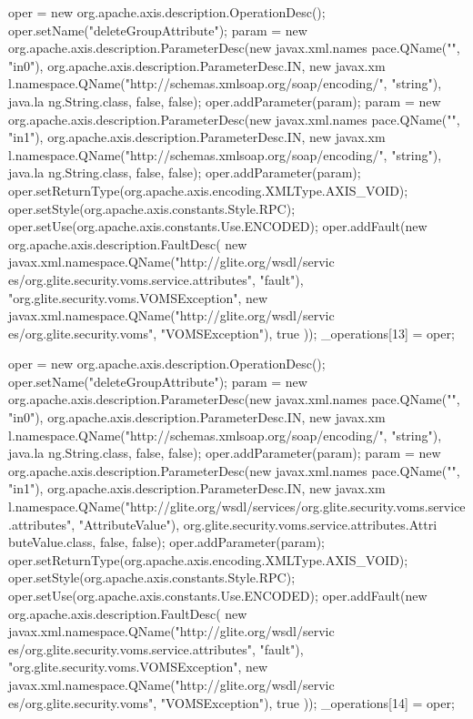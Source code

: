 \begin{DoxyCode}
{        oper = new org.apache.axis.description.OperationDesc();
        oper.setName("deleteGroupAttribute");
        param = new org.apache.axis.description.ParameterDesc(new javax.xml.names
      pace.QName("", "in0"), org.apache.axis.description.ParameterDesc.IN, new javax.xm
      l.namespace.QName("http://schemas.xmlsoap.org/soap/encoding/", "string"), java.la
      ng.String.class, false, false);
        oper.addParameter(param);
        param = new org.apache.axis.description.ParameterDesc(new javax.xml.names
      pace.QName("", "in1"), org.apache.axis.description.ParameterDesc.IN, new javax.xm
      l.namespace.QName("http://schemas.xmlsoap.org/soap/encoding/", "string"), java.la
      ng.String.class, false, false);
        oper.addParameter(param);
        oper.setReturnType(org.apache.axis.encoding.XMLType.AXIS_VOID);
        oper.setStyle(org.apache.axis.constants.Style.RPC);
        oper.setUse(org.apache.axis.constants.Use.ENCODED);
        oper.addFault(new org.apache.axis.description.FaultDesc(
                      new javax.xml.namespace.QName("http://glite.org/wsdl/servic
      es/org.glite.security.voms.service.attributes", "fault"),
                      "org.glite.security.voms.VOMSException",
                      new javax.xml.namespace.QName("http://glite.org/wsdl/servic
      es/org.glite.security.voms", "VOMSException"), 
                      true
                     ));
        _operations[13] = oper;

        oper = new org.apache.axis.description.OperationDesc();
        oper.setName("deleteGroupAttribute");
        param = new org.apache.axis.description.ParameterDesc(new javax.xml.names
      pace.QName("", "in0"), org.apache.axis.description.ParameterDesc.IN, new javax.xm
      l.namespace.QName("http://schemas.xmlsoap.org/soap/encoding/", "string"), java.la
      ng.String.class, false, false);
        oper.addParameter(param);
        param = new org.apache.axis.description.ParameterDesc(new javax.xml.names
      pace.QName("", "in1"), org.apache.axis.description.ParameterDesc.IN, new javax.xm
      l.namespace.QName("http://glite.org/wsdl/services/org.glite.security.voms.service
      .attributes", "AttributeValue"), org.glite.security.voms.service.attributes.Attri
      buteValue.class, false, false);
        oper.addParameter(param);
        oper.setReturnType(org.apache.axis.encoding.XMLType.AXIS_VOID);
        oper.setStyle(org.apache.axis.constants.Style.RPC);
        oper.setUse(org.apache.axis.constants.Use.ENCODED);
        oper.addFault(new org.apache.axis.description.FaultDesc(
                      new javax.xml.namespace.QName("http://glite.org/wsdl/servic
      es/org.glite.security.voms.service.attributes", "fault"),
                      "org.glite.security.voms.VOMSException",
                      new javax.xml.namespace.QName("http://glite.org/wsdl/servic
      es/org.glite.security.voms", "VOMSException"), 
                      true
                     ));
        _operations[14] = oper;

}
\end{DoxyCode}
